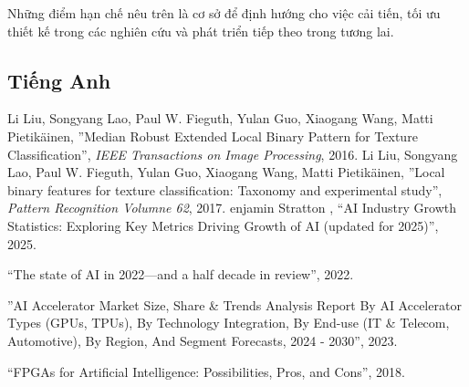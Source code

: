 \documentclass[a4paper,12pt,oneside]{book}%
\renewcommand{\baselinestretch}{1.4}
\begin{document}
Những điểm hạn chế nêu trên là cơ sở để định hướng cho việc cải tiến, tối ưu thiết kế trong các nghiên cứu và phát triển tiếp theo trong tương lai.




\def\baselinestretch{1}
\vspace{-2cm}
\renewcommand{\bibname}{Tài liệu tham khảo}
\clearpage
{}
{}
\renewcommand{\refname}{Literary works}
\begin{thebibliography}{xx}
	\section*{Tiếng Anh}	
	Li Liu, Songyang Lao, Paul W. Fieguth, Yulan Guo, Xiaogang Wang, Matti Pietikäinen, ''Median Robust Extended Local Binary Pattern for Texture Classification'', {\em IEEE Transactions on Image Processing}, 2016.
	Li Liu, Songyang Lao, Paul W. Fieguth, Yulan Guo, Xiaogang Wang, Matti Pietikäinen, ''Local binary features for texture classification: Taxonomy and experimental study'', {\em Pattern Recognition Volumne 62}, 2017.
	enjamin Stratton  , ``AI Industry Growth Statistics: Exploring Key Metrics Driving Growth of AI (updated for 2025)'', 2025.
	
	``The state of AI in 2022—and a half decade in review'', 2022.
	
	''AI Accelerator Market Size, Share \& Trends Analysis Report By AI Accelerator Types (GPUs, TPUs), By Technology Integration, By End-use (IT \& Telecom, Automotive), By Region, And Segment Forecasts, 2024 - 2030'', 2023.
	
	``FPGAs for Artificial Intelligence: Possibilities, Pros, and Cons'', 2018.
	

\end{thebibliography}
\end{document}

